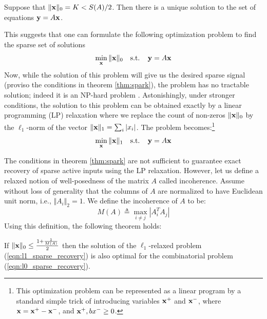 \begin{theorem}
\label{thm:spark}
Suppose that $\Vert \mathbf{x} \Vert_0 = K < S(A) / 2$. Then there is a unique solution to the
set of equations $\mathbf{y} = A \mathbf{x}$.
\end{theorem}

This suggests that one can formulate the following optimization problem to find the sparse set of solutions
\begin{equation}
\label{eqn:l0_sparse_recovery}
\min_{\mathbf{x}} \Vert \mathbf{x} \Vert_0  ~~\mbox{ s.t. }~~ \mathbf{y} = A \mathbf{x}
\end{equation}
Now, while the solution of this problem will give us the desired sparse signal (proviso the conditions in
theorem \ref{thm:spark}), the problem has no tractable solution; indeed it is an NP-hard problem \cite{natarajan1995sparse_recovery_complexity}. Astonishingly, under stronger conditions, the solution to this problem can be obtained exactly by a linear
programming (LP) relaxation where we replace the count of non-zeros $\Vert \mathbf{x} \Vert_0$  by the $\ell_1$-norm
of the vector $\Vert \mathbf{x} \Vert_1 = \sum_i | x_i|$. The problem becomes:\footnote{This optimization problem can be represented as a linear
program by a standard simple trick of introducing variables $\mathbf{x}^+$ and $\mathbf{x}^-$, where $\mathbf{x} = \mathbf{x}^+ - \mathbf{x}^-$,
and $\mathbf{x}^+, bx^- \ge 0$. }
\begin{equation}
\label{eqn:l1_sparse_recovery}
\min_{\mathbf{x}} \Vert \mathbf{x} \Vert_1  ~~\mbox{ s.t. }~~ \mathbf{y} = A \mathbf{x}
\end{equation}

The conditions in theorem \ref{thm:spark} are not sufficient to guarantee exact recovery of
sparse active inputs using the LP relaxation. However, let us define a relaxed notion of
well-posedness of the matrix $A$ called incoherence. Assume without loss of generality that
the columns of $A$ are normalized to have Euclidean unit norm, i.e., $\Vert A_i \Vert_2 = 1$.  We define the incoherence of $A$ to be:
\begin{equation}
M(A) \triangleq \max_{i \ne j} | A_i^T A_j |
\end{equation}
Using this definition, the following theorem holds:

\begin{theorem}
\label{thm:incoherence}
If $\Vert \mathbf{x} \Vert_0 \le \frac{ 1 + \frac{1}{M(A)}} {2}$ then the solution of the $\ell_1$-relaxed
problem (\ref{eqn:l1_sparse_recovery}) is also optimal for the combinatorial problem
(\ref{eqn:l0_sparse_recovery}).
\end{theorem}

